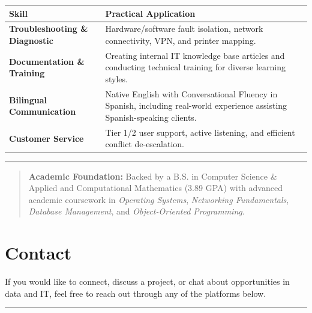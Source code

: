 \documentclass[
]{book}
\newcounter{none} %
\begin{document}
{\def\LTcaptype{none} %
\begin{longtable}[]{@{}
  >{\raggedright\arraybackslash}p{}
  >{\raggedright\arraybackslash}p{}@{}}
\toprule\noalign{}
\begin{minipage}[b]{\linewidth}\raggedright
Skill
\end{minipage} & \begin{minipage}[b]{\linewidth}\raggedright
Practical Application
\end{minipage} \\
\midrule\noalign{}
\endhead
\bottomrule\noalign{}
\endlastfoot
\textbf{Troubleshooting \& Diagnostic} & Hardware/software fault isolation, network connectivity, VPN, and printer mapping. \\
\textbf{Documentation \& Training} & Creating internal IT knowledge base articles and conducting technical training for diverse learning styles. \\
\textbf{Bilingual Communication} & Native English with Conversational Fluency in Spanish, including real-world experience assisting Spanish-speaking clients. \\
\textbf{Customer Service} & Tier 1/2 user support, active listening, and efficient conflict de-escalation. \\
\end{longtable}
}

\begin{center}\rule{0.5\linewidth}{0.5pt}\end{center}

\begin{quote}
\textbf{Academic Foundation:} Backed by a B.S. in Computer Science \& Applied and Computational Mathematics (3.89 GPA) with advanced academic coursework in \emph{Operating Systems}, \emph{Networking Fundamentals}, \emph{Database Management}, and \emph{Object-Oriented Programming}.
\end{quote}

\chapter{Contact}\label{contact}

If you would like to connect, discuss a project, or chat about opportunities in data and IT, feel free to reach out through any of the platforms below.

\begin{center}\rule{0.5\linewidth}{0.5pt}\end{center}
\end{document}
